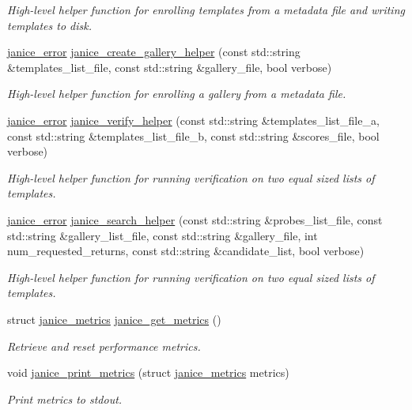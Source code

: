 \begin{DoxyCompactItemize}
\begin{DoxyCompactList}\small\item\em High-\/level helper function for enrolling templates from a metadata file and writing templates to disk. \end{DoxyCompactList}\item 
\hyperlink{group__janice_ga4873d49c1f9d6a6880dfbd485cf6ba72}{janice\+\_\+error} \hyperlink{group__janice__io_ga522f4e34ea383a8bcf4923cf7e9a8683}{janice\+\_\+create\+\_\+gallery\+\_\+helper} (const std\+::string \&templates\+\_\+list\+\_\+file, const std\+::string \&gallery\+\_\+file, bool verbose)
\begin{DoxyCompactList}\small\item\em High-\/level helper function for enrolling a gallery from a metadata file. \end{DoxyCompactList}\item 
\hyperlink{group__janice_ga4873d49c1f9d6a6880dfbd485cf6ba72}{janice\+\_\+error} \hyperlink{group__janice__io_gaa1be5e201120ba3f1c9d8a0cfd71e2a0}{janice\+\_\+verify\+\_\+helper} (const std\+::string \&templates\+\_\+list\+\_\+file\+\_\+a, const std\+::string \&templates\+\_\+list\+\_\+file\+\_\+b, const std\+::string \&scores\+\_\+file, bool verbose)
\begin{DoxyCompactList}\small\item\em High-\/level helper function for running verification on two equal sized lists of templates. \end{DoxyCompactList}\item 
\hyperlink{group__janice_ga4873d49c1f9d6a6880dfbd485cf6ba72}{janice\+\_\+error} \hyperlink{group__janice__io_ga30acfccf2fee82552c157208bf8fceb2}{janice\+\_\+search\+\_\+helper} (const std\+::string \&probes\+\_\+list\+\_\+file, const std\+::string \&gallery\+\_\+list\+\_\+file, const std\+::string \&gallery\+\_\+file, int num\+\_\+requested\+\_\+returns, const std\+::string \&candidate\+\_\+list, bool verbose)
\begin{DoxyCompactList}\small\item\em High-\/level helper function for running verification on two equal sized lists of templates. \end{DoxyCompactList}\item 
struct \hyperlink{structjanice__metrics}{janice\+\_\+metrics} \hyperlink{group__janice__io_gaa6aa5fa8550b3066a0dad696d6368762}{janice\+\_\+get\+\_\+metrics} ()
\begin{DoxyCompactList}\small\item\em Retrieve and reset performance metrics. \end{DoxyCompactList}\item 
void \hyperlink{group__janice__io_ga34184d56e2c5585facb11e1e6b734325}{janice\+\_\+print\+\_\+metrics} (struct \hyperlink{structjanice__metrics}{janice\+\_\+metrics} metrics)
\begin{DoxyCompactList}\small\item\em Print metrics to stdout. \end{DoxyCompactList}\end{DoxyCompactItemize}


